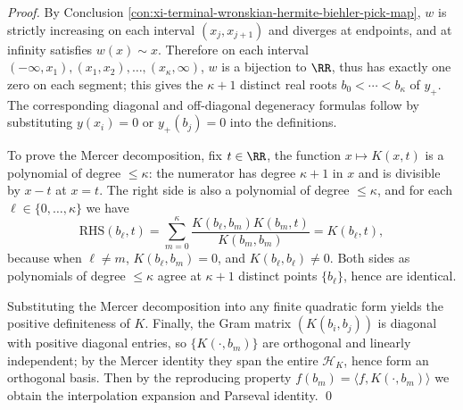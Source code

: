 \begin{proof}
By Conclusion \ref{con:xi-terminal-wronskian-hermite-biehler-pick-map}, \(w\) is strictly increasing on each interval \((x_j,x_{j+1})\) and diverges at endpoints, and at infinity satisfies \(w(x)\sim x\).
Therefore on each interval \((-\infty,x_1),(x_1,x_2),\dots,(x_\kappa,\infty)\), \(w\) is a bijection to \(\RR\), thus has exactly one zero on each segment; this gives the \(\kappa+1\) distinct real roots \(b_0<\cdots<b_\kappa\) of \(y_{+}\).
The corresponding diagonal and off-diagonal degeneracy formulas follow by substituting \(y(x_i)=0\) or \(y_{+}(b_j)=0\) into the definitions.
\par
To prove the Mercer decomposition, fix \(t\in\RR\), the function \(x\mapsto K(x,t)\) is a polynomial of degree \(\le \kappa\): the numerator has degree \(\kappa+1\) in \(x\) and is divisible by \(x-t\) at \(x=t\).
The right side is also a polynomial of degree \(\le \kappa\), and for each \(\ell\in\{0,\dots,\kappa\}\) we have
\[
\text{RHS}(b_\ell,t)=\sum_{m=0}^{\kappa}\frac{K(b_\ell,b_m)K(b_m,t)}{K(b_m,b_m)}=K(b_\ell,t),
\]
because when \(\ell\neq m\), \(K(b_\ell,b_m)=0\), and \(K(b_\ell,b_\ell)\neq 0\).
Both sides as polynomials of degree \(\le\kappa\) agree at \(\kappa+1\) distinct points \(\{b_\ell\}\), hence are identical.
\par
Substituting the Mercer decomposition into any finite quadratic form yields the positive definiteness of \(K\).
Finally, the Gram matrix \((K(b_i,b_j))\) is diagonal with positive diagonal entries, so \(\{K(\cdot,b_m)\}\) are orthogonal and linearly independent; by the Mercer identity they span the entire \(\mathcal{H}_K\), hence form an orthogonal basis.
Then by the reproducing property \(f(b_m)=\langle f,K(\cdot,b_m)\rangle\) we obtain the interpolation expansion and Parseval identity. \qed
\end{proof}



